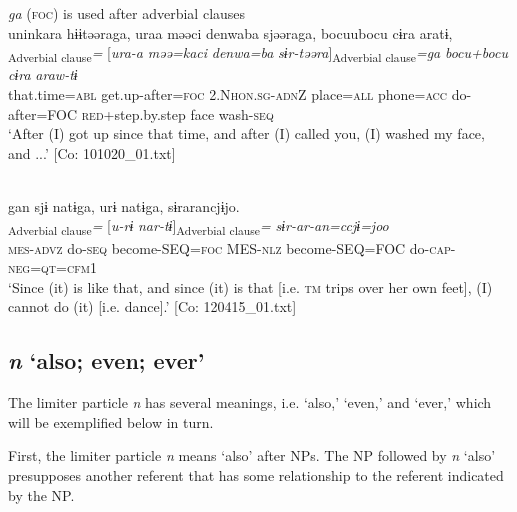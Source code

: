 \ea\label{ex:10.16}   \textit{ga} (\textsc{foc}) is used after adverbial clauses\\
  \ea  %
      \glll    uninkara  hɨɨtəəraga,  uraa  məəci {\textbar}denwa{\textbar}ba  sjəəraga,  bocuubocu  cɨra  aratɨ,\\
      [\textit{unin=kara}  \textit{hɨɨr-təəra}]\textsubscript{Adverbial clause}\textit{=}  [\textit{ura-a}  \textit{məə=kaci}    \textit{denwa=ba}  \textit{sɨr-təəra}]\textsubscript{Adverbial clause}\textit{=ga}  \textit{bocu+bocu}  \textit{cɨra}  \textit{araw-tɨ}\\
      that.time=\textsc{abl}  get.up-after=\textsc{foc}  2.N\textsc{hon}.\textsc{sg}-\textsc{adn}Z  place=\textsc{all}   phone=\textsc{acc}  do-after=FOC  \textsc{red}+step.by.step  face  wash-\textsc{seq}\\
      \glt       ‘After (I) got up since that time, and after (I) called you, (I) washed my face, and ...’ [Co: 101020\_01.txt]

  \ex{}\\
      \glll    gan  sjɨ  natɨga,  urɨ  natɨga,  sɨrarancjɨjo.\\
      [\textit{ga-n}  \textit{sɨr-tɨ}  \textit{nar-tɨ}]\textsubscript{Adverbial clause}\textit{=}  [\textit{u-rɨ}   \textit{nar-tɨ}]\textsubscript{Adverbial clause}\textit{=}  \textit{sɨr-ar-an=ccjɨ=joo}\\
      \textsc{mes}-\textsc{advz}  do-\textsc{seq}  become-SEQ=\textsc{foc}  MES-\textsc{nlz}  become-SEQ=FOC  do-\textsc{cap}-\textsc{neg}=\textsc{qt}=\textsc{cfm}1\\
      \glt       ‘Since (it) is like that, and since (it) is that [i.e. \textsc{tm} trips over her own feet], (I) cannot do (it) [i.e. dance].’ [Co: 120415\_01.txt]
    \z
\z

\subsection{\textit{n} ‘also; even; ever’}\label{sec:10.1.3}

The limiter particle \textit{n} has several meanings, i.e. ‘also,’ ‘even,’ and ‘ever,’ which will be exemplified below in turn.

First, the limiter particle \textit{n} means ‘also’ after NPs. The NP followed by \textit{n} ‘also’ presupposes another referent that has some relationship to the referent indicated by the NP.

